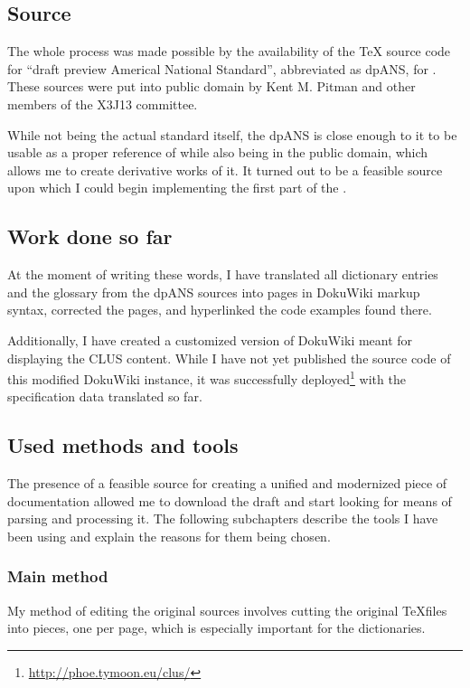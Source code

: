 \subsection{Source}

The whole process was made possible by the availability of the \TeX{} source code for ``draft preview Americal National Standard'', abbreviated as dpANS, for \cl{}. These sources were put into public domain by Kent M. Pitman and other members of the X3J13 committee.

While not being the actual standard itself, the dpANS is close enough to it to be usable as a proper reference of \cl{} while also being in the public domain, which allows me to create derivative works of it. It turned out to be a feasible source upon which I could begin implementing the first part of the \us{}.

\subsection{Work done so far}

At the moment of writing these words, I have translated all dictionary entries and the glossary from the dpANS sour\-ces into pages in Doku\-Wiki markup syntax, corrected the pages, and hyperlinked the code examples found there.

Additionally, I have created a customized version of Doku\-Wiki meant for displaying the CLUS content. While I have not yet published the source code of this modified Doku\-Wiki instance, it was successfully deployed\footnote{\url{http://phoe.tymoon.eu/clus/}} with the specification data translated so far.

\subsection{Used methods and tools}

The presence of a feasible source for creating a unified and modernized piece of \cl{} documentation allowed me to download the draft and start looking for means of parsing and processing it. The following subchapters describe the tools I have been using and explain the reasons for them being chosen.

\subsubsection{Main method}

My method of editing the original sources involves cutting the original \TeX files into pieces, one per page, which is especially important for the dictionaries.

